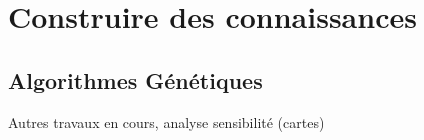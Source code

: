 
\section{Construire des connaissances}

\subsection{Algorithmes Génétiques}


Autres travaux en cours, analyse sensibilité (cartes)
